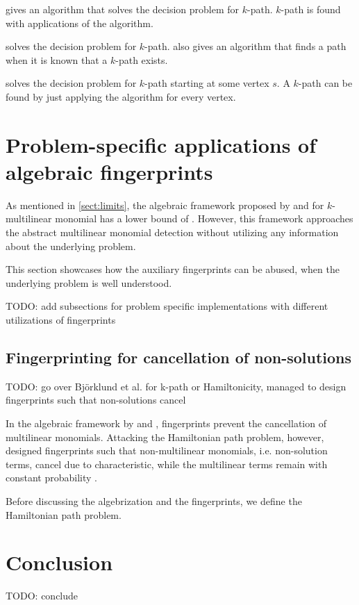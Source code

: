 \cite{Koutis08} gives an algorithm that solves the decision problem for $k$-path. 
$k$-path is found with  applications of the algorithm.

\cite{Williams09} solves the decision problem for $k$-path. \cite{Williams09} also gives an algorithm 
that finds a path when it is known that a $k$-path exists.

\cite{Björklund17} solves the decision problem for $k$-path starting at some vertex $s$. 
A $k$-path can be found by just applying the algorithm for every vertex.

\section{Problem-specific applications of algebraic fingerprints}

As mentioned in \cref{sect:limits}, the algebraic framework proposed by 
\citeauthor{Koutis08} and \citeauthor{Williams09} \cite{Koutis08,Williams09} for 
$k$-multilinear monomial has a lower bound of . 
However, this framework approaches the abstract multilinear monomial detection without 
utilizing any information about the underlying problem.

This section showcases how the auxiliary fingerprints can be abused, 
when the underlying problem is well understood.

TODO: add subsections for problem specific implementations with different utilizations of fingerprints

\subsection{Fingerprinting for cancellation of non-solutions}

TODO: go over Björklund et al. for k-path or Hamiltonicity, managed to design fingerprints such that non-solutions cancel

In the algebraic framework by \citeauthor{Koutis08} and \citeauthor{Williams09}, 
fingerprints prevent the cancellation of multilinear monomials. 
Attacking the Hamiltonian path problem, however, \citeauthor{Björklund14} 
designed fingerprints such that non-multilinear monomials, i.e. non-solution terms, 
cancel due to characteristic, while the multilinear terms 
remain with constant probability \cite{Björklund14}.

Before discussing the algebrization and the fingerprints, 
we define the Hamiltonian path problem.

\begin{problem}
\end{problem}

\section{Conclusion}

TODO: conclude